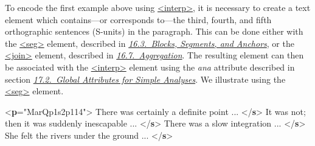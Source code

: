 To encode the first example above using \hyperref[TEI.interp]{<interp>}, it is necessary to create a text element which contains—or corresponds to—the third, fourth, and fifth orthographic sentences (S-units) in the paragraph. This can be done either with the \hyperref[TEI.seg]{<seg>} element, described in \textit{\hyperref[SASE]{16.3.\ Blocks, Segments, and Anchors}}, or the \hyperref[TEI.join]{<join>} element, described in \textit{\hyperref[SAAG]{16.7.\ Aggregation}}. The resulting element can then be associated with the \hyperref[TEI.interp]{<interp>} element using the {\itshape ana} attribute described in section \textit{\hyperref[AIATTS]{17.2.\ Global Attributes for Simple Analyses}}. We illustrate using the \hyperref[TEI.seg]{<seg>} element. \par\bgroup{}\exampleFont \begin{shaded}\noindent\mbox{}{<\textbf{p}\hspace*{1em}{xml:id}="{MarQp1s2p114}">}\mbox{}\newline 
{}There was certainly a definite point ... {</\textbf{s}>}\mbox{}\newline 
{}It was not; then it was suddenly inescapable ... {</\textbf{s}>}\mbox{}\newline 
{}\mbox{}\newline 
\hspace*{1em}There was a slow integration ... {</\textbf{s}>}\mbox{}\newline 
\hspace*{1em}She felt the rivers under the ground ... {</\textbf{s}>}\mbox{}\newline 

\end{shaded}
